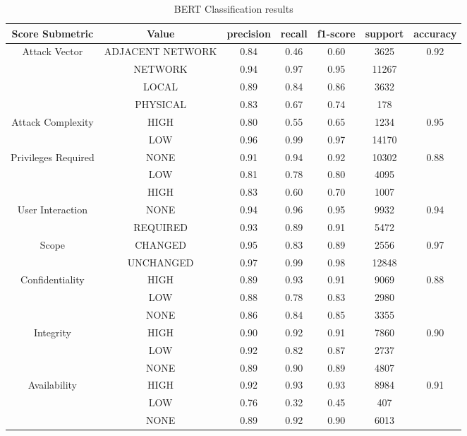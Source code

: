 \documentclass[times, utf8, zavrsni, english]{fer}
\begin{document}
\begin{table}[h!]
	\centering
	\begin{tabular}{| c | c | c | c | c | c | c |} 
		\hline
		Score Submetric & Value & precision & recall & f1-score & support & accuracy \\ [0.5ex] 
		\hline\hline
		\multirow{4}{*}{Attack Vector} & ADJACENT NETWORK & 0.84 & 0.46 & 0.60 & 3625 & \multirow{4}{*}{0.92} \\ 
		& NETWORK & 0.94 & 0.97 & 0.95 & 11267 &
		 \\ 
		& LOCAL & 0.89 & 0.84 & 0.86 & 3632 & \\ 
		& PHYSICAL & 0.83 & 0.67 & 0.74 & 178 & \\ 
		\hline
		\multirow{2}{*}{Attack Complexity} & HIGH & 0.80 & 0.55 & 0.65 & 1234 & \multirow{2}{*}{0.95} \\ 
		& LOW & 0.96 & 0.99 & 0.97 & 14170 & \\ 
		\hline
		\multirow{3}{*}{Privileges Required} & NONE & 0.91 & 0.94 & 0.92 & 10302 & \multirow{3}{*}{0.88} \\ 
		& LOW & 0.81 & 0.78 & 0.80 & 4095 & \\ 
		& HIGH & 0.83 & 0.60 & 0.70 & 1007 & \\ 
		\hline
		\multirow{2}{*}{User Interaction} & NONE & 0.94 & 0.96 & 0.95 & 9932 & \multirow{2}{*}{0.94} \\ 
		& REQUIRED & 0.93 & 0.89 & 0.91 & 5472 & \\ 
		\hline
		\multirow{2}{*}{Scope} & CHANGED & 0.95 & 0.83 & 0.89 & 2556 & \multirow{2}{*}{0.97} \\ 
		& UNCHANGED & 0.97 & 0.99 & 0.98 & 12848 & \\ 
		\hline
		\multirow{3}{*}{Confidentiality} & HIGH & 0.89 & 0.93 & 0.91 & 9069 & \multirow{3}{*}{0.88} \\ 
		& LOW & 0.88 & 0.78 & 0.83 & 2980 & \\ 
		& NONE & 0.86 & 0.84 & 0.85 & 3355 & \\ 
		\hline
		\multirow{3}{*}{Integrity} & HIGH & 0.90 & 0.92 & 0.91 & 7860 & \multirow{3}{*}{0.90} \\ 
		& LOW & 0.92 & 0.82 & 0.87 & 2737 & \\ 
		& NONE & 0.89 & 0.90 & 0.89 & 4807 & \\ 
		\hline
		\multirow{3}{*}{Availability} & HIGH & 0.92 & 0.93 & 0.93 & 8984 & \multirow{3}{*}{0.91} \\ 
		& LOW & 0.76 & 0.32 & 0.45 & 407 & \\ 
		& NONE & 0.89 & 0.92 & 0.90 & 6013 & \\ 
		\hline
		
	\end{tabular}
	\caption{BERT Classification results}
	\label{table:12}
\end{table} 
\end{document}
